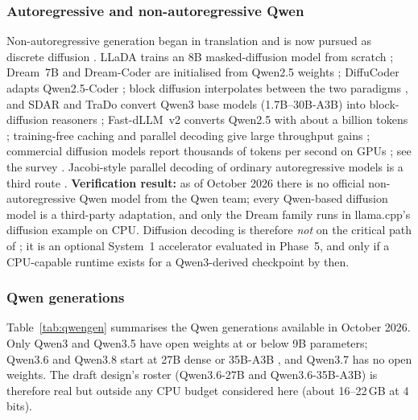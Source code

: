 \subsubsection{Autoregressive and non-autoregressive Qwen}
Non-autoregressive generation began in translation
\cite{gu2018nat,ghazvininejad2019maskpredict} and is now pursued as discrete
diffusion \cite{austin2021d3pm,lou2024sedd,sahoo2024mdlm}. LLaDA trains an
8B masked-diffusion model from scratch \cite{nie2025llada}; Dream~7B and
Dream-Coder are initialised from Qwen2.5 weights \cite{ye2025dream};
DiffuCoder adapts Qwen2.5-Coder \cite{gong2025diffucoder}; block diffusion
interpolates between the two paradigms \cite{arriola2025blockdiffusion}, and
SDAR and TraDo convert Qwen3 base models (1.7B--30B-A3B) into block-diffusion
reasoners \cite{cheng2026sdar,wang2026trado}; Fast-dLLM~v2 converts Qwen2.5
with about a billion tokens \cite{wu2026fastdllmv2}; training-free caching and
parallel decoding give large throughput gains \cite{wu2025fastdllm};
commercial diffusion models report thousands of tokens per second on GPUs
\cite{inception2025mercury}; see the survey \cite{li2025dlmsurvey}. Jacobi-style
parallel decoding of ordinary autoregressive models is a third route
\cite{santilli2023parallel,kou2024cllms}. \textbf{Verification result:} as of
October 2026 there is no official non-autoregressive Qwen model from the Qwen
team; every Qwen-based diffusion model is a third-party adaptation, and only
the Dream family runs in llama.cpp's diffusion example on CPU. Diffusion
decoding is therefore \emph{not} on the critical path of \Sys; it is an
optional System~1 accelerator evaluated in Phase~5, and only if a
CPU-capable runtime exists for a Qwen3-derived checkpoint by then.

\subsubsection{Qwen generations}
Table~\ref{tab:qwengen} summarises the Qwen generations available in
October 2026. Only Qwen3 \cite{qwen2025qwen3} and Qwen3.5
\cite{qwen3_5_blog_2026} have open weights at or below 9B parameters; Qwen3.6
and Qwen3.8 start at 27B dense or 35B-A3B
\cite{qwen3_6_27b_blog_2026,qwen3_6_35b_blog_2026,qwen3_8_blog_2026}, and
Qwen3.7 has no open weights. The draft design's roster (Qwen3.6-27B and
Qwen3.6-35B-A3B) is therefore real but outside any CPU budget considered here
(about 16--22\,GB at 4 bits).

